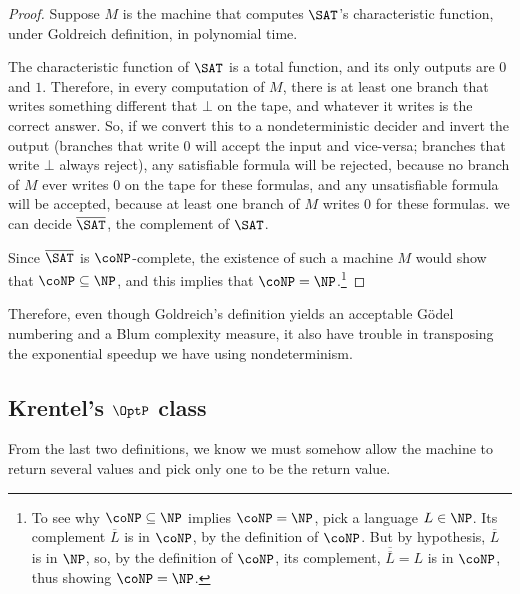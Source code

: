 \documentclass[12pt]{article}
\theoremstyle{definition}
\begin{document}
\begin{proof}
    Suppose $M$ is the machine that computes $\SAT$'s characteristic function,
    under Goldreich definition, in polynomial time.

    The characteristic function of $\SAT$ is a total function,
    and its only outputs are $0$ and $1$.
    Therefore, in every computation of $M$,
    there is at least one branch that writes something different that $\bot$ on the tape,
    and whatever it writes is the correct answer.
    So, if we convert this to a nondeterministic decider and invert the output
    (branches that write $0$ will accept the input and vice-versa;
    branches that write $\bot$ always reject),
    any satisfiable formula will be rejected,
    because no branch of $M$ ever writes $0$ on the tape for these formulas,
    and any unsatisfiable formula will be accepted,
    because at least one branch of $M$ writes $0$ for these formulas.
    we can decide $\overline \SAT$, the complement of $\SAT$.

    Since $\overline \SAT$ is $\coNP$-complete,
    the existence of such a machine $M$
    would show that $\coNP \subseteq \NP$,
    and this implies that $\coNP = \NP$.\footnote{
        To see why $\coNP \subseteq \NP$ implies $\coNP = \NP$,
        pick a language $L \in \NP$.
        Its complement $\overline L$ is in $\coNP$, by the definition of $\coNP$.
        But by hypothesis, $\overline L$ is in $\NP$,
        so, by the definition of $\coNP$,
        its complement, $\overline{\overline L} = L$ is in $\coNP$,
        thus showing $\coNP = \NP$.
    }
\end{proof}

Therefore, even though Goldreich's definition
yields an acceptable Gödel numbering and a Blum complexity measure,
it also have trouble in transposing the exponential speedup
we have using nondeterminism.

\subsection{Krentel's $\OptP$ class}

From the last two definitions,
we know we must somehow allow the machine to return several values
and pick only one to be the return value.
\end{document}
